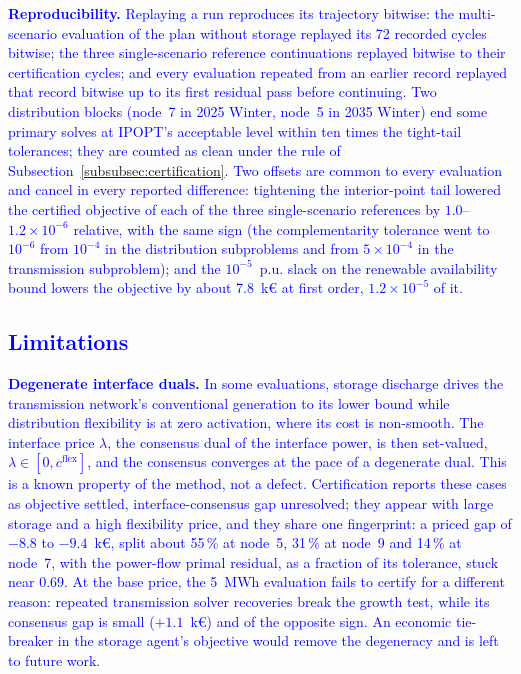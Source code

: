 \textcolor{blue}{
    \textbf{Reproducibility.} Replaying a run reproduces its trajectory bitwise: the multi-scenario evaluation of the plan without storage replayed its 72 recorded cycles bitwise; the three single-scenario reference continuations replayed bitwise to their certification cycles; and every evaluation repeated from an earlier record replayed that record bitwise up to its first residual pass before continuing. Two distribution blocks (node~7 in 2025 Winter, node~5 in 2035 Winter) end some primary solves at IPOPT's acceptable level within ten times the tight-tail tolerances; they are counted as clean under the rule of Subsection~\ref{subsubsec:certification}. Two offsets are common to every evaluation and cancel in every reported difference: tightening the interior-point tail lowered the certified objective of each of the three single-scenario references by $1.0$--$1.2 \times 10^{-6}$ relative, with the same sign (the complementarity tolerance went to $10^{-6}$ from $10^{-4}$ in the distribution subproblems and from $5 \times 10^{-4}$ in the transmission subproblem); and the $10^{-5}$~p.u. slack on the renewable availability bound lowers the objective by about 7.8~k\euro{} at first order, $1.2 \times 10^{-5}$ of it.
}

\subsection{\textcolor{blue}{Limitations}}
\label{subsec:res_limitations}

\textcolor{blue}{
    \textbf{Degenerate interface duals.} In some evaluations, storage discharge drives the transmission network's conventional generation to its lower bound while distribution flexibility is at zero activation, where its cost is non-smooth. The interface price $\lambda$, the consensus dual of the interface power, is then set-valued, $\lambda \in [0, c^{\text{flex}}]$, and the consensus converges at the pace of a degenerate dual. This is a known property of the method, not a defect. Certification reports these cases as objective settled, interface-consensus gap unresolved; they appear with large storage and a high flexibility price, and they share one fingerprint: a priced gap of $-8.8$ to $-9.4$~k\euro, split about 55\,\% at node~5, 31\,\% at node~9 and 14\,\% at node~7, with the power-flow primal residual, as a fraction of its tolerance, stuck near 0.69. At the base price, the 5~MWh evaluation fails to certify for a different reason: repeated transmission solver recoveries break the growth test, while its consensus gap is small ($+1.1$~k\euro) and of the opposite sign. An economic tie-breaker in the storage agent's objective would remove the degeneracy and is left to future work.
}

